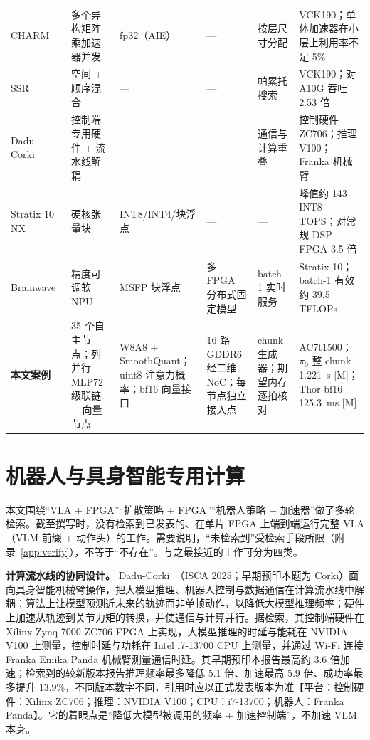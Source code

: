 \documentclass[a4paper,10.5pt]{ctexart}
\newcommand{\tM}{\textsf{[M]}}              %
\newcommand{\pizero}{$\pi_0$}
\newcommand{\hw}[1]{\textsf{【平台：#1】}}
\begin{document}
\begin{small}
\begin{longtable}{p{1.6cm} p{2.4cm} p{2.1cm} p{2.2cm} p{2.2cm} p{2.8cm}}
CHARM~\cite{charm} & 多个异构矩阵乘加速器并发 & fp32（AIE） & — & 按层尺寸分配 & VCK190；单体加速器在小层上利用率不足 5\% \\
SSR~\cite{ssr} & 空间 + 顺序混合 & — & — & 帕累托搜索 & VCK190；对 A10G 吞吐 2.53 倍 \\
Dadu-Corki~\cite{corki} & 控制端专用硬件 + 流水线解耦 & — & — & 通信与计算重叠 & 控制硬件 ZC706；推理 V100；Franka 机械臂 \\
Stratix 10 NX~\cite{s10nx_fpt} & 硬核张量块 & INT8/INT4/块浮点 & — & — & 峰值约 143 INT8 TOPS；对常规 DSP FPGA 3.5 倍 \\
Brainwave~\cite{brainwave} & 精度可调软 NPU & MSFP 块浮点~\cite{msfp} & 多 FPGA 分布式固定模型 & batch-1 实时服务 & Stratix 10；batch-1 有效约 39.5 TFLOPs \\
\textbf{本文案例} & 35 个自主节点；列并行 MLP72 级联链 + 向量节点 & W8A8 + SmoothQuant；uint8 注意力概率；bf16 向量接口 & 16 路 GDDR6 经二维 NoC；每节点独立接入点 & chunk 生成器；期望内存逐拍核对 & AC7t1500；\pizero{} 整 chunk 1.221~s \tM；Thor bf16 125.3~ms \tM \\
\end{longtable}
\end{small}

\section{机器人与具身智能专用计算}\label{sec:robot}

本文围绕“VLA + FPGA”“扩散策略 + FPGA”“机器人策略 + 加速器”做了多轮检索。截至撰写时，没有检索到已发表的、在单片 FPGA 上端到端运行完整 VLA（VLM 前缀 + 动作头）的工作。需要说明，“未检索到”受检索手段所限（附录~\ref{app:verify}），不等于“不存在”。与之最接近的工作可分为四类。

\textbf{计算流水线的协同设计。} Dadu-Corki~\cite{corki}（ISCA 2025；早期预印本题为 Corki）面向具身智能机械臂操作，把大模型推理、机器人控制与数据通信在计算流水线中解耦：算法上让模型预测近未来的轨迹而非单帧动作，以降低大模型推理频率；硬件上加速从轨迹到关节力矩的转换，并使通信与计算并行。据检索，其控制端硬件在 Xilinx Zynq-7000 ZC706 FPGA 上实现，大模型推理的时延与能耗在 NVIDIA V100 上测量，控制时延与功耗在 Intel i7-13700 CPU 上测量，并通过 Wi-Fi 连接 Franka Emika Panda 机械臂测量通信时延。其早期预印本报告最高约 3.6 倍加速；检索到的较新版本报告推理频率最多降低 5.1 倍、加速最高 5.9 倍、成功率最多提升 13.9\%，不同版本数字不同，引用时应以正式发表版本为准\hw{控制硬件：Xilinx ZC706；推理：NVIDIA V100；CPU：i7-13700；机器人：Franka Panda}。它的着眼点是“降低大模型被调用的频率 + 加速控制端”，不加速 VLM 本身。
\end{document}
